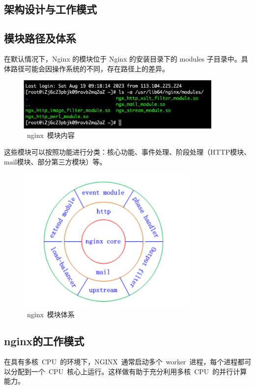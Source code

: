 \documentclass[12pt, a4paper]{article} %
\begin{document}
\begin{CJK*}{UTF8}{gbsn}
\clearpage
\section{架构设计与工作模式}
\subsection{模块路径及体系}
在默认情况下，Nginx 的模块位于 Nginx 的安装目录下的 modules 子目录中。具体路径可能会因操作系统的不同，存在路径上的差异。

\begin{figure}[htbp]
    \centering
    \includegraphics[width=0.9\textwidth]{./imgs/catch2023-08-19-16.28.04.png}
    \caption{~nginx~模块内容}
\end{figure}

这些模块可以按照功能进行分类：核心功能、事件处理、阶段处理（HTTP模块、mail模块、部分第三方模块）等。

\begin{figure}[htbp]
    \centering
    \includegraphics[width=0.8\textwidth]{./imgs/catch2023-08-19-16.16.15.png}
    \caption{~nginx~模块体系}
\end{figure}

\subsection{nginx的工作模式}
在具有多核~CPU~的环境下，NGINX~通常启动多个~worker~进程，每个进程都可以分配到一个~CPU~核心上运行。这样做有助于充分利用多核~CPU~的并行计算能力。\par


\end{CJK*}
\end{document}
